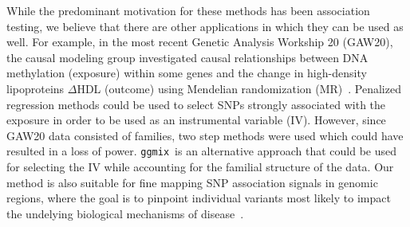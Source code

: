 \documentclass[12pt,letter]{article}\usepackage[]{graphicx}\usepackage[]{color}
\newcommand{\bX}{\textbf{X}}
\newcommand{\ggmix}{\texttt{ggmix}}
\newcommand{\bXtilde}{\widetilde{\bX}}
\newcommand{\bU}{\textbf{U}}
\newcommand{\bbeta}{\boldsymbol{\beta}}
\begin{document}
While the predominant motivation for these methods has been association testing, we believe that there are other applications in which they can be used as well. 
For example, in the most recent Genetic Analysis Workship 20 (GAW20),  the causal modeling group investigated causal
relationships between DNA methylation (exposure) within some genes
and the change in high-density lipoproteins $\Delta$HDL (outcome) using Mendelian randomization (MR)~\citep{davey2003mendelian}. 
Penalized regression methods could be used to select SNPs strongly associated with the exposure in order to be used as an instrumental variable (IV). 
However, since GAW20 data consisted of families, two step methods were used which could have resulted in a loss of power. \ggmix~is an alternative approach that could be used for selecting the IV while accounting for the familial structure of the data. 
Our method is also suitable for fine mapping SNP association signals in genomic regions, where the goal is to pinpoint individual variants most likely to impact the undelying biological mechanisms of disease~\citep{spain2015strategies}.

\end{document}
